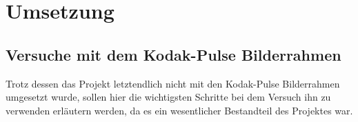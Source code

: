 \chapter{ Umsetzung }\label{chap:Umsetzung}
\vspace*{-3cm}
\begin{flushleft}
\section{Versuche mit dem Kodak-Pulse Bilderrahmen}
  Trotz dessen das Projekt letztendlich nicht mit den Kodak-Pulse Bilderrahmen umgesetzt wurde, sollen hier die wichtigsten Schritte bei dem Versuch ihn zu verwenden erläutern werden, da es ein wesentlicher Bestandteil des Projektes war.

\end{flushleft}
